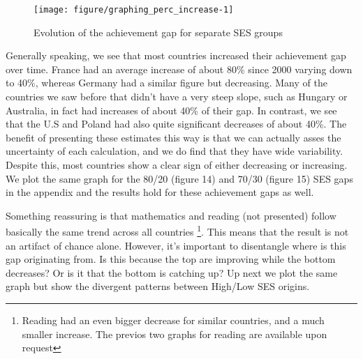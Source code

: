 \documentclass[11pt, a4paper]{article}\usepackage[]{graphicx}\usepackage[]{color}
\begin{document}


\begin{figure}

{\centering \texttt{[image: figure/graphing\_perc\_increase-1]} 

}

\caption[Evolution of the achievement gap for separate SES groups]{Evolution of the achievement gap for separate SES groups}\label{fig:graphing_perc_increase}
\end{figure}



Generally speaking, we see that most countries increased their achievement gap over time. France had an average increase of about 80\% since 2000 varying down to 40\%, whereas Germany had a similar figure but decreasing. Many of the countries we saw before that didn't have a very steep slope, such as Hungary or Australia, in fact had increases of about 40\% of their gap. In contrast, we see that the U.S and Poland had also quite significant decreases of about 40\%. The benefit of presenting these estimates this way is that we can actually asses the uncertainty of each calculation, and we do find that they have wide variability. Despite this, most countries show a clear sign of either decreasing or increasing. We plot the same graph for the 80/20 (figure 14) and 70/30 (figure 15) SES gaps in the appendix and the results hold for these achievement gaps as well.



Something reassuring is that mathematics and reading (not presented) follow basically the same trend across all countries \footnote{Reading had an even bigger decrease for similar countries, and a much smaller increase. The previos two graphs for reading are available upon request}. This means that the result is not an artifact of chance alone. However, it's important to disentangle where is this gap originating from. Is this because the top are improving while the bottom decreases? Or is it that the bottom is catching up? Up next we plot the same graph but show the divergent patterns between High/Low SES origins.
\end{document}
